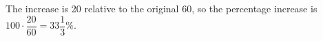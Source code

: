 The increase is 20 relative to the original 60, so the percentage increase is $ 100\cdot\dfrac{20}{60}=\boxed{33\dfrac{1}{3}\%}$.
